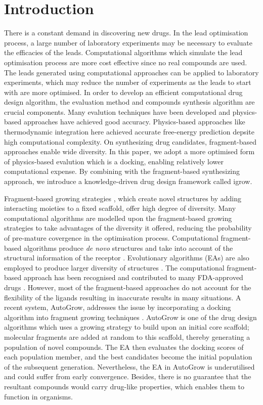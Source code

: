 \documentclass[10pt,conference,letterpaper]{IEEEtran}
\begin{document}
\section{Introduction}\label{sec:introduction}
There is a constant demand in discovering new drugs.
In the lead optimisation process, a large number of laboratory experiments may be necessary to evaluate the efficacies of the leads.
Computational algorithms which simulate the lead optimisation process are more cost effective since no real compounds are used.
The leads generated using computational approaches can be applied to laboratory experiments, which may reduce the number of experiments as the leads to start with are more optimised.
In order to develop an efficient computational drug design algorithm, the evaluation method and compounds synthesis algorithm are crucial components.
Many evalution techniques have been developed and physics-based approaches have achieved good accuracy. Physics-based approaches like thermodynamic integration \cite{ref24,VelazquezCampoy2001217} here achieved accurate free-energy prediction depsite high computational complexity.
On synthesizing drug candidates, fragment-based approaches enable wide diversity.
In this paper, we adopt a more optimised form of physics-based evalution which is a docking, enabling relatively lower computational expense.
By combining with the fragment-based synthesizing approach, we introduce a knowledge-driven drug design framework called igrow.

Fragment-based growing strategies \cite{ref11,ref20}, which create novel structures by adding interacting moieties to a fixed scaffold, offer high degree of diversity.
Many computational algorithms are modelled upon the fragment-based growing strategies to take advantages of the diversity it offered, reducing the probability of pre-mature covergence in the optimisation process.
Computational fragment-based algorithms produce {\itshape de novo} structures \cite{ref4,ref5,ref6,ref8} and take into account of the structural information of the receptor \cite{ref3}.
Evolutionary algorithms (EAs) are also employed to produce larger diversity of structures \cite{ref7,ref9}.
The computational fragment-based approach has been recognised and contributed to many FDA-approved drugs \cite{ref2}.
However, most of the fragment-based approaches do not account for the flexibility of the ligands resulting in inaccurate results in many situations.
A recent system, AutoGrow, addresses the issue by incorporating a docking algorithm into fragment growing techniques \cite{114}.
AutoGrow is one of the drug design algorithms which uses a growing strategy to build upon an initial core scaffold; molecular fragments are added at random to this scaffold, thereby generating a population of novel compounds.
The EA then evaluates the docking scores of each population member, and the best candidates become the initial population of the subsequent generation.
Nevertheless, the EA in AutoGrow is underutilised and could suffer from early convergence.
Besides, there is no guarantee that the resultant compounds would carry drug-like properties, which enables them to function in organisms.
\end{document}
